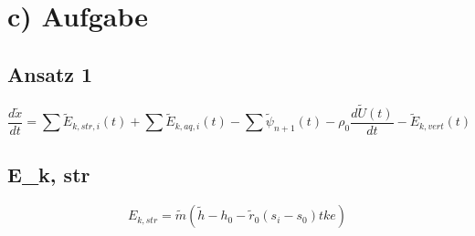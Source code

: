 \section*{c) Aufgabe}

\subsection*{Ansatz 1}

\begin{equation*}
\frac{d\tilde{x}}{dt} = \sum \tilde{E}_{k, str, i}(t) + \sum \tilde{E}_{k, aq, i}(t) - \sum \tilde{\psi}_{n+1}(t) - \rho_0 \frac{d\tilde{U}(t)}{dt} - \tilde{E}_{k, vert}(t)
\end{equation*}

\subsection*{E_k, str}

\begin{equation*}
E_{k, str} = \tilde{m} (\tilde{h} - h_0 - \tilde{r}_0 (s_i - s_0) tke)
\end{equation*}